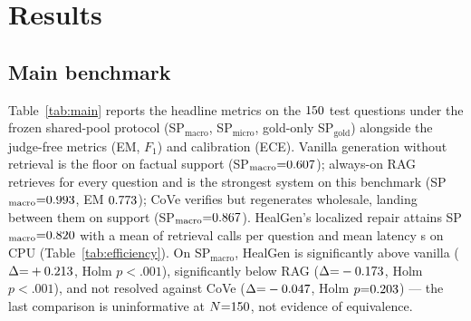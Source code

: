 \section{Results}
\label{sec:results}

\subsection{Main benchmark}
Table~\ref{tab:main} reports the headline metrics on the $\NTest$ test
questions under the frozen shared-pool protocol (SP$_{\text{macro}}$,
SP$_{\text{micro}}$, gold-only SP$_{\text{gold}}$) alongside the
judge-free metrics (EM, $F_1$) and calibration (ECE).  Vanilla generation
without retrieval is the floor on factual support
(SP$_{\text{macro}}{=}0.607$); always-on RAG retrieves for every
question and is the strongest system on this benchmark
(SP$_{\text{macro}}{=}0.993$, EM $0.773$); CoVe verifies but
regenerates wholesale, landing between them on support
(SP$_{\text{macro}}{=}0.867$).  HealGen's localized repair attains
SP$_{\text{macro}}{=}0.820$ with a mean of \RetrHealGen{} retrieval
calls per question and mean latency \LatHealGen{}s on CPU
(Table~\ref{tab:efficiency}).  On SP$_{\text{macro}}$, HealGen is
significantly above vanilla ($\Delta{=}+0.213$, Holm
$p{<}.001$), significantly below RAG ($\Delta{=}-0.173$, Holm
$p{<}.001$), and not resolved against CoVe ($\Delta{=}-0.047$,
Holm $p{=}0.203$) --- the last comparison is uninformative at
$N{=}150$, not
evidence of equivalence.

\begin{table}[t]
\centering
\caption{Main benchmark on $\NTest$ HaluEval-QA test questions, shared
\texttt{flan-t5-base} generator, frozen shared-pool scoring (SP columns)
plus the gold-only condition (SP$_{\text{gold}}$; judge credits only the
gold passage).  95\% CIs are paired bootstrap over questions (2000
resamples).}
\label{tab:main}

\end{table}

\begin{table}[t]
\centering
\caption{Efficiency: mean BM25 calls per question, end-to-end latency on
CPU (mean / p50 / p95), and abstention rate.}
\label{tab:efficiency}
\resizebox{\columnwidth}{!}{}
\end{table}

